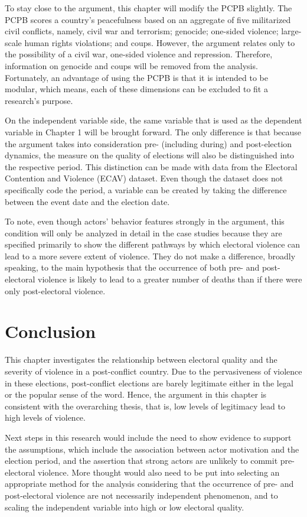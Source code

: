 \documentclass [11pt]{article}
\begin{document}
To stay close to the argument, this chapter will modify the PCPB slightly. The PCPB scores a country's peacefulness based on an aggregate of five militarized civil conflicts, namely, civil war and terrorism; genocide; one-sided violence; large-scale human rights violations; and coups. However, the argument relates only to the possibility of a civil war, one-sided violence and repression. Therefore, information on genocide and coups will be removed from the analysis. Fortunately, an advantage of using the PCPB is that it is intended to be modular, which means, each of these dimensions can be excluded to fit a research's purpose.

On the independent variable side, the same variable that is used as the dependent variable in Chapter 1 will be brought forward. The only difference is that because the argument takes into consideration pre- (including during) and post-election dynamics, the measure on the quality of elections will also be distinguished into the respective period. This distinction can be made with data from the Electoral Contention and Violence (ECAV) dataset. Even though the dataset does not specifically code the period, a variable can be created by taking the difference between the event date and the election date.

To note, even though actors' behavior features strongly in the argument, this condition will only be analyzed in detail in the case studies because they are specified primarily to show the different pathways by which electoral violence can lead to a more severe extent of violence. They do not make a difference, broadly speaking, to the main hypothesis that the occurrence of both pre- and post-electoral violence is likely to lead to a greater number of deaths than if there were only post-electoral violence.

\section*{Conclusion}

This chapter investigates the relationship between electoral quality and the severity of violence in a post-conflict country. Due to the pervasiveness of violence in these elections, post-conflict elections are barely legitimate either in the legal or the popular sense of the word. Hence, the argument in this chapter is consistent with the overarching thesis, that is, low levels of legitimacy lead to high levels of violence.

Next steps in this research would include the need to show evidence to support the assumptions, which include the association between actor motivation and the election period, and the assertion that strong actors are unlikely to commit pre-electoral violence. More thought would also need to be put into selecting an appropriate method for the analysis considering that the occurrence of pre- and post-electoral violence are not necessarily independent phenomenon, and to scaling the independent variable into high or low electoral quality.
\end{document}
